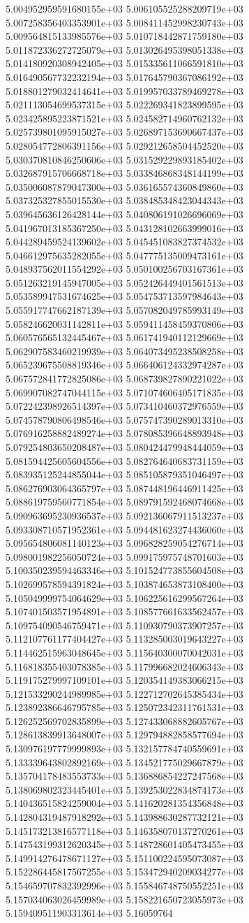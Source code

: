 	5.004952959591680155e+03	5.006105525288209719e+03	5.007258356403353901e+03	5.008411452998230743e+03	5.009564815133985576e+03	5.010718442871759180e+03	5.011872336272725079e+03	5.013026495398051338e+03	5.014180920308942405e+03	5.015335611066591810e+03	5.016490567732232194e+03	5.017645790367086192e+03	5.018801279032414641e+03	5.019957033789469278e+03	5.021113054699537315e+03	5.022269341823899595e+03	5.023425895223871521e+03	5.024582714960762132e+03	5.025739801095915027e+03	5.026897153690667437e+03	5.028054772806391156e+03	5.029212658504452520e+03	5.030370810846250606e+03	5.031529229893185402e+03	5.032687915706668718e+03	5.033846868348144199e+03	5.035006087879047300e+03	5.036165574360849860e+03	5.037325327855015530e+03	5.038485348423044343e+03	5.039645636126428144e+03	5.040806191026696069e+03	5.041967013185367250e+03	5.043128102663999016e+03	5.044289459524139602e+03	5.045451083827374532e+03	5.046612975635282055e+03	5.047775135009473161e+03	5.048937562011554292e+03	5.050100256703167361e+03	5.051263219145947005e+03	5.052426449401561513e+03	5.053589947531674625e+03	5.054753713597984643e+03	5.055917747662187139e+03	5.057082049785993149e+03	5.058246620031142811e+03	5.059411458459370806e+03	5.060576565132445467e+03	5.061741940112129669e+03	5.062907583460219939e+03	5.064073495238508258e+03	5.065239675508819346e+03	5.066406124332974287e+03	5.067572841772825086e+03	5.068739827890221022e+03	5.069907082747044115e+03	5.071074606405171835e+03	5.072242398926514397e+03	5.073410460372976559e+03	5.074578790806498546e+03	5.075747390289013310e+03	5.076916258882489274e+03	5.078085396648893948e+03	5.079254803650208487e+03	5.080424479948444059e+03	5.081594425605604556e+03	5.082764640683731159e+03	5.083935125244855044e+03	5.085105879351046497e+03	5.086276903064365797e+03	5.087448196446911425e+03	5.088619759560771854e+03	5.089791592468074668e+03	5.090963695230936537e+03	5.092136067911513237e+03	5.093308710571952361e+03	5.094481623274436060e+03	5.095654806081140123e+03	5.096828259054276714e+03	5.098001982256050724e+03	5.099175975748701603e+03	5.100350239594463346e+03	5.101524773855604508e+03	5.102699578594391824e+03	5.103874653873108400e+03	5.105049999754064629e+03	5.106225616299567264e+03	5.107401503571954891e+03	5.108577661633562457e+03	5.109754090546759471e+03	5.110930790373907257e+03	5.112107761177404427e+03	5.113285003019643227e+03	5.114462515963048645e+03	5.115640300070042031e+03	5.116818355403078385e+03	5.117996682024606343e+03	5.119175279997109101e+03	5.120354149383066215e+03	5.121533290244989985e+03	5.122712702645385434e+03	5.123892386646795785e+03	5.125072342311761531e+03	5.126252569702835899e+03	5.127433068882605767e+03	5.128613839913648007e+03	5.129794882858577694e+03	5.130976197779999893e+03	5.132157784740559691e+03	5.133339643802892169e+03	5.134521775029667879e+03	5.135704178483553733e+03	5.136886854227247568e+03	5.138069802323445401e+03	5.139253022834874173e+03	5.140436515824259004e+03	5.141620281354356848e+03	5.142804319487918292e+03	5.143988630287732121e+03	5.145173213816577118e+03	5.146358070137270261e+03	5.147543199312620345e+03	5.148728601405473455e+03	5.149914276478671127e+03	5.151100224595073087e+03	5.152286445817567255e+03	5.153472940209034277e+03	5.154659707832392996e+03	5.155846748750552251e+03	5.157034063026459989e+03	5.158221650723055973e+03	5.159409511903313614e+03	5.16059764